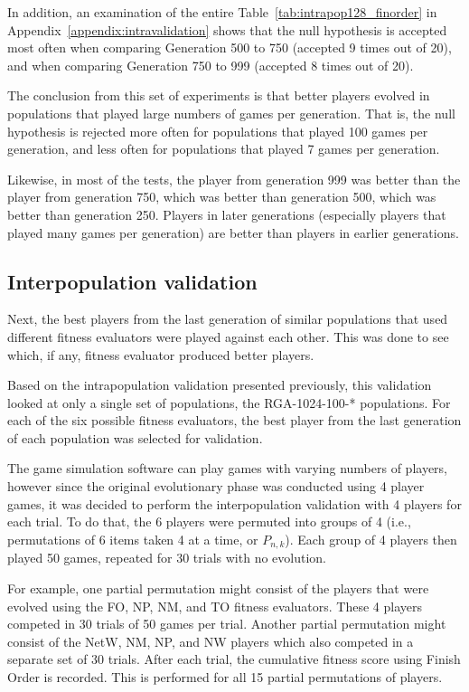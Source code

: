 In addition, an examination of the entire Table~\ref{tab:intrapop128_finorder}
in Appendix~\ref{appendix:intravalidation} shows that the null hypothesis is
accepted most often when comparing Generation 500 to 750 (accepted 9 times out
of 20), and when comparing Generation 750 to 999 (accepted 8 times out of 20).

The conclusion from this set of experiments is that better players evolved in
populations that played large numbers of games per generation. That is, the null
hypothesis is rejected more often for populations that played 100 games per
generation, and less often for populations that played 7 games per generation.

Likewise, in most of the tests, the player from generation 999 was better than
the player from generation 750, which was better than generation 500, which was
better than generation 250. Players in later generations (especially players
that played many games per generation) are better than players in earlier
generations.

\subsection{Interpopulation validation} \label{6_interPopValidation}

Next, the best players from the last generation of similar populations that used
different fitness evaluators were played against each other. This was done to
see which, if any, fitness evaluator produced better players. 

Based on the intrapopulation validation presented previously, this validation
looked at only a single set of populations, the RGA-1024-100-* populations. For
each of the six possible fitness evaluators, the best player from the last
generation of each population was selected for validation. 

The game simulation software can play games with varying numbers of players,
however since the original evolutionary phase was conducted using 4 player
games, it was decided to perform the interpopulation validation with 4 players
for each trial. To do that, the 6 players were permuted into groups of 4 (i.e.,
permutations of 6 items taken 4 at a time, or \(P_{n,k}\)). Each group of 4
players then played 50 games, repeated for 30 trials with no evolution.

For example, one partial permutation might consist of the players that were
evolved using the FO, NP, NM, and TO fitness evaluators. These 4 players
competed in 30 trials of 50 games per trial. Another partial permutation might
consist of the NetW, NM, NP, and NW players which also competed in a separate
set of 30 trials. After each trial, the cumulative fitness score using
Finish Order is recorded. This is performed for all 15 partial permutations of
players.

